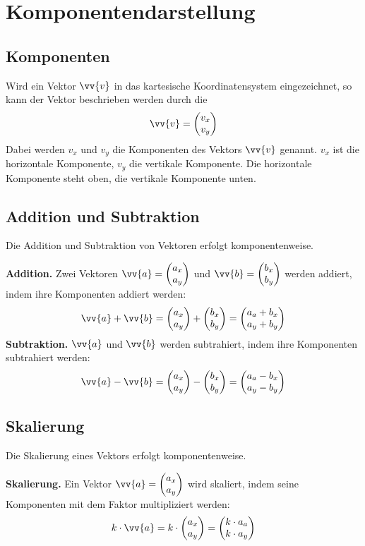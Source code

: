 \newpage
\section{Komponentendarstellung}

\subsection{Komponenten}

Wird ein Vektor $\vv{v}$ in das kartesische Koordinatensystem eingezeichnet, so kann der Vektor beschrieben werden durch die
\[
  \vv{v} = \vxy{v_{x}}{v_{y}}
\]
Dabei werden $v_{x}$ und $v_{y}$ die Komponenten des Vektors $\vv{v}$ genannt. $v_{x}$ ist die horizontale Komponente, $v_{y}$ die vertikale Komponente. Die horizontale Komponente steht oben, die vertikale Komponente unten.

\subsection{Addition und Subtraktion}
Die Addition und Subtraktion von Vektoren erfolgt komponentenweise.

\begin{theorem}
  \textbf{Addition.} Zwei Vektoren $\vv{a} = \vxy{a_{x}}{a_{y}}$ und $\vv{b} = \vxy{b_{x}}{b_{y}}$ werden addiert, indem ihre Komponenten addiert werden:
  \[
    \vv{a}+\vv{b} = \vxy{a_{x}}{a_{y}}+\vxy{b_{x}}{b_{y}} = \vxy{a_{a}+b_{x}}{a_{y}+b_{y}}
  \]
  \textbf{Subtraktion.} $\vv{a}$ und $\vv{b}$ werden subtrahiert, indem ihre Komponenten subtrahiert werden:
  \[
    \vv{a}-\vv{b} = \vxy{a_{x}}{a_{y}}-\vxy{b_{x}}{b_{y}} = \vxy{a_{a}-b_{x}}{a_{y}-b_{y}}
  \]

\end{theorem}

\subsection{Skalierung}

Die Skalierung eines Vektors erfolgt komponentenweise.

\begin{theorem}
  \textbf{Skalierung.} Ein Vektor  $\vv{a} = \vxy{a_{x}}{a_{y}}$ wird skaliert, indem seine Komponenten mit dem Faktor multipliziert werden:
  \[
    k\cdot\vv{a} = k\cdot\vxy{a_{x}}{a_{y}} = \vxy{k\cdot a_{a}}{k\cdot a_{y}}
  \]
\end{theorem}

